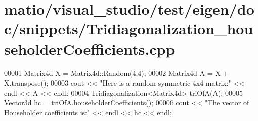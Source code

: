 \hypertarget{matio_2visual__studio_2test_2eigen_2doc_2snippets_2_tridiagonalization__householder_coefficients_8cpp_source}{}\section{matio/visual\+\_\+studio/test/eigen/doc/snippets/\+Tridiagonalization\+\_\+householder\+Coefficients.cpp}
\label{matio_2visual__studio_2test_2eigen_2doc_2snippets_2_tridiagonalization__householder_coefficients_8cpp_source}

\begin{DoxyCode}
00001 Matrix4d X = Matrix4d::Random(4,4);
00002 Matrix4d A = X + X.transpose();
00003 cout << \textcolor{stringliteral}{"Here is a random symmetric 4x4 matrix:"} << endl << A << endl;
00004 Tridiagonalization<Matrix4d> triOfA(A);
00005 Vector3d hc = triOfA.householderCoefficients();
00006 cout << \textcolor{stringliteral}{"The vector of Householder coefficients is:"} << endl << hc << endl;
\end{DoxyCode}
